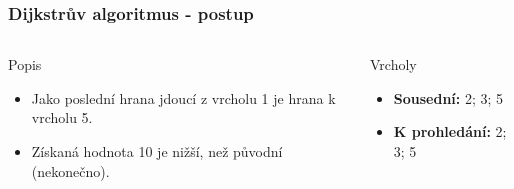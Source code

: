 \documentclass{beamer}
\begin{document}
\begin{frame}
    \frametitle{Dijkstrův algoritmus - postup}
    \begin{columns}
        \begin{block}{Popis}
            \begin{itemize}
                \item Jako poslední hrana jdoucí z vrcholu 1 je hrana k vrcholu 5.
                \item Získaná hodnota 10 je nižší, než původní (nekonečno).
            \end{itemize}
        \end{block}
        \begin{block}{Vrcholy}
            \begin{itemize}
                \item \textbf{Sousední:} 2; 3; 5 
                \item \textbf{K prohledání:} 2; 3; 5
            \end{itemize}
        \end{block}
    \end{columns}
\end{frame}
\end{document}
